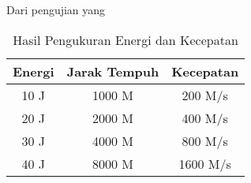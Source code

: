 Dari pengujian yang \lipsum[1]

\begin{longtable}{|c|c|c|}
  \caption{Hasil Pengukuran Energi dan Kecepatan}
  \label{tb:EnergiKecepatan}\\
  \hline
  \rowcolor[HTML]{C0C0C0}
  \textbf{Energi} & \textbf{Jarak Tempuh} & \textbf{Kecepatan} \\
  \hline
  10 J & 1000 M & 200 M/s \\
  20 J & 2000 M & 400 M/s \\
  30 J & 4000 M & 800 M/s \\
  40 J & 8000 M & 1600 M/s \\
  \hline
\end{longtable}

\lipsum[2-4]
